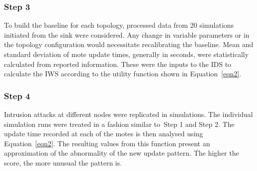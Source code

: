 \documentclass[conference,final]{IEEEtran}
\begin{document}
\subsubsection*{Step 3} 
To build the baseline for each topology, processed data from 20 simulations initiated from the sink were considered. %
Any change in variable parameters or in the topology configuration would necessitate recalibrating the baseline.
Mean and standard deviation of mote update times, generally in seconds, were statistically calculated from reported information. %
These were the inputs to the IDS to calculate the IWS according to the utility function shown in Equation~\ref{eqn2}. 


\subsubsection*{Step 4} 
Intrusion attacks at different nodes were replicated in simulations.
The individual simulation runs were treated in a fashion  similar to~Step 1 and Step 2.
The update time recorded at each of the motes is then analysed using Equation~\ref{eqn2}.
The resulting values from this function present an approximation of the abnormality of the new update pattern. The higher the score, the more unusual the pattern is. 
\end{document}

